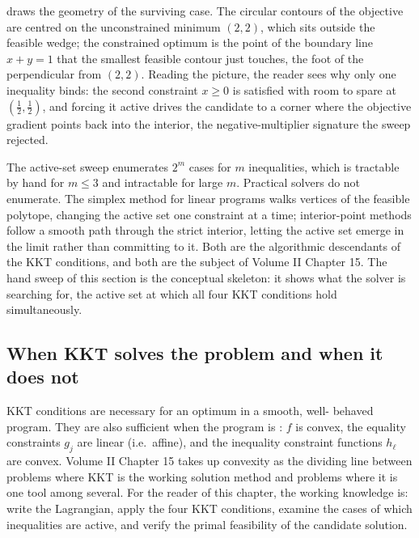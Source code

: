 

 draws the geometry of the surviving
case. The circular contours of the objective are centred on the
unconstrained minimum $(2, 2)$, which sits outside the feasible wedge;
the constrained optimum is the point of the boundary line $x + y = 1$
that the smallest feasible contour just touches, the foot of the
perpendicular from $(2, 2)$. Reading the picture, the reader sees why
only one inequality binds: the second constraint $x \geq 0$ is satisfied
with room to spare at $(\tfrac{1}{2}, \tfrac{1}{2})$, and forcing it
active drives the candidate to a corner where the objective gradient
points back into the interior, the negative-multiplier signature the
sweep rejected.

\begin{mastery}
The active-set sweep enumerates $2^{m}$ cases for $m$ inequalities,
which is tractable by hand for $m \leq 3$ and intractable for large
$m$. Practical solvers do not enumerate. The simplex method for
linear programs walks vertices of the feasible polytope, changing
the active set one constraint at a time; interior-point methods
follow a smooth path through the strict interior, letting the active
set emerge in the limit rather than committing to it. Both are the
algorithmic descendants of the KKT conditions, and both are the
subject of Volume II Chapter 15. The hand sweep of this section is
the conceptual skeleton: it shows what the solver is searching for,
the active set at which all four KKT conditions hold simultaneously.
\end{mastery}

\subsection{When KKT solves the problem and when it does not}

KKT conditions are necessary for an optimum in a smooth, well-
behaved program. They are also sufficient when the program is
: $f$ is convex, the equality constraints $g_{j}$ are
linear (i.e.\ affine), and the inequality constraint functions
$h_{\ell}$ are convex. Volume II Chapter 15 takes up convexity as
the dividing line between problems where KKT is the working
solution method and problems where it is one tool among several.
For the reader of this chapter, the working knowledge is: write the
Lagrangian, apply the four KKT conditions, examine the cases of
which inequalities are active, and verify the primal feasibility of
the candidate solution.

